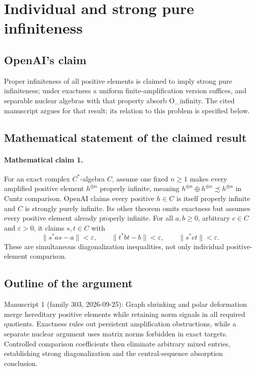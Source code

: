 \documentclass[11pt]{article}
\begin{document}
\section*{Individual and strong pure infiniteness}

\subsection{OpenAI's claim}
Proper infiniteness of all positive elements is claimed to imply strong pure infiniteness; under exactness a uniform finite-amplification version suffices, and separable nuclear algebras with that property absorb O\_infinity. The cited manuscript argues for that result; its relation to this problem is specified below.

\subsection{Mathematical statement of the claimed result}
\paragraph{Mathematical claim 1.} For an exact complex $C^*$-algebra $C$, assume one fixed $n\ge1$ makes every amplified positive element $h^{\oplus n}$ properly infinite, meaning $h^{\oplus n}\oplus h^{\oplus n}\precsim h^{\oplus n}$ in Cuntz comparison. OpenAI claims every positive $h\in C$ is itself properly infinite and $C$ is strongly purely infinite.
Its other theorem omits exactness but assumes every positive element already properly infinite. For all $a,b\ge0$, arbitrary $c\in C$ and $\varepsilon>0$, it claims $s,t\in C$ with
\[
\|s^*as-a\|<\varepsilon,\qquad\|t^*bt-b\|<\varepsilon,\qquad\|s^*ct\|<\varepsilon.
\]
These are simultaneous diagonalization inequalities, not only individual positive-element comparison.

\subsection{Outline of the argument}
Manuscript 1 (family 303, 2026-09-25): Graph shrinking and polar deformation merge hereditary positive elements while retaining norm signals in all required quotients. Exactness rules out persistent amplification obstructions, while a separate nuclear argument uses matrix norms forbidden in exact targets. Controlled comparison coefficients then eliminate arbitrary mixed entries, establishing strong diagonalization and the central-sequence absorption conclusion.
\end{document}
